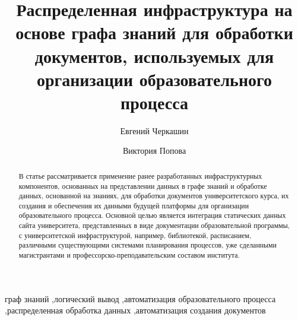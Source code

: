 \documentclass[
]{aiitart}
\newcommand{\email}[1]{\texttt{#1}}
\begin{document}

\title{Распределенная инфраструктура на основе графа знаний для обработки документов, используемых для организации образовательного процесса}

\author[1,2]{Евгений Черкашин} \author[2]{Виктория Попова}

\address[1]{Институт динамики систем и теории управления им. В.М. Матросова СО ран, Иркутск, Россия} \address[2]{Институт математики и информационных технологий, Иркутский государственный университет, Иркутск, Россия\\[0.7em] \email{eugeneai@icc.ru};\quad\email{victorypopova1@gmail.com}}


\begin{abstract}
В статье рассматривается применение ранее разработанных инфраструктурных компонентов, основанных на представлении данных в графе знаний и обработке данных, основанной на знаниях, для обработки документов университетского курса, их создания и обеспечения их данными будущей платформы для организации образовательного процесса. Основной целью является интеграция статических данных сайта университета, представленных в виде документации образовательной программы, с университетской инфраструктурой, например, библиотекой, расписанием, различными существующими системами планирования процессов, уже сделанными магистрантами и профессорско-преподавательским составом института.
\end{abstract}

\begin{keywords}
граф знаний \sep логический вывод \sep автоматизация образовательного процесса \sep распределенная обработка данных \sep автоматизация создания документов
\end{keywords}
\end{document}
